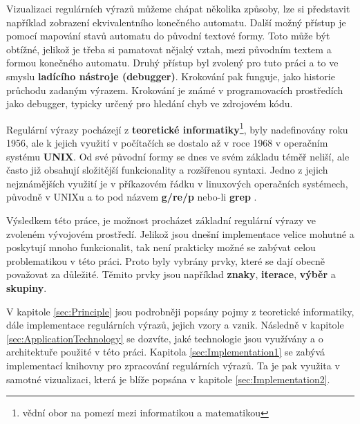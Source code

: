 Vizualizaci regulárních výrazů můžeme chápat několika způsoby, 
lze si představit například zobrazení ekvivalentního konečného automatu.
Další možný přístup je pomocí mapování stavů automatu do původní textové formy. 
Toto může být obtížné, jelikož je třeba si pamatovat nějaký vztah, 
mezi původním textem a formou konečného automatu. 
Druhý přístup byl zvolený pro tuto
práci a to ve smyslu \textbf{ladícího nástroje (debugger)}. Krokování pak funguje, jako historie průchodu zadaným výrazem. 
Krokování je známé v programovacích prostředích jako debugger,
typicky určený pro hledání chyb ve zdrojovém kódu.

Regulární výrazy pocházejí z \textbf{teoretické informatiky}\footnote{vědní obor na pomezí mezi informatikou a matematikou}, 
byly nadefinovány roku 1956, ale k jejich využití v počítačích se dostalo až v roce 1968 v operačním systému \textbf{UNIX}.
Od své původní formy se dnes ve svém základu téměř neliší, ale často již obsahují složitější funkcionality a rozšířenou syntaxi.
Jedno z jejich nejznámějších využití je v příkazovém řádku v linuxových operačních systémech, původně v UNIXu a to pod názvem \textbf{g/re/p} nebo-li \textbf{grep} 
\cite{Wikipedia_2024}. 

Výsledkem této práce, je možnost procházet základní regulární výrazy ve zvoleném vývojovém prostředí. 
Jelikož jsou dnešní implementace velice mohutné a poskytují mnoho funkcionalit, tak není prakticky možné
se zabývat celou problematikou v této práci. 
Proto byly vybrány prvky, které se dají obecně považovat za důležité. 
Těmito prvky jsou například \textbf{znaky}, \textbf{iterace}, \textbf{výběr} a \textbf{skupiny}.

V kapitole \ref{sec:Principle} jsou podrobněji popsány pojmy z teoretické informatiky, dále implementace regulárních výrazů, jejich vzory a vznik.
Následně v kapitole \ref{sec:ApplicationTechnology} se dozvíte, jaké technologie jsou využívány a o architektuře použité v této práci.
Kapitola \ref{sec:Implementation1} se zabývá implementací knihovny pro zpracování regulárních výrazů. 
Ta je pak využita v samotné vizualizaci, která je blíže popsána v kapitole \ref{sec:Implementation2}.

\endinput